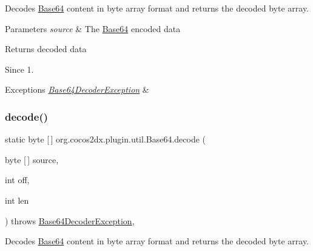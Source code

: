 Decodes \hyperlink{classorg_1_1cocos2dx_1_1plugin_1_1util_1_1Base64}{Base64} content in byte array format and returns the decoded byte array.


\begin{DoxyParams}{Parameters}
{\em source} & The \hyperlink{classorg_1_1cocos2dx_1_1plugin_1_1util_1_1Base64}{Base64} encoded data \\
\hline
\end{DoxyParams}
\begin{DoxyReturn}{Returns}
decoded data 
\end{DoxyReturn}
\begin{DoxySince}{Since}
1. 
\end{DoxySince}

\begin{DoxyExceptions}{Exceptions}
{\em \hyperlink{classorg_1_1cocos2dx_1_1plugin_1_1util_1_1Base64DecoderException}{Base64\+Decoder\+Exception}} & \\
\hline
\end{DoxyExceptions}
\mbox{\label{classorg_1_1cocos2dx_1_1plugin_1_1util_1_1Base64_a7c98b97ad848ef0e656b81020bf51d72}} 
\subsubsection{\texorpdfstring{decode()}{decode()}\hspace{0.1cm}{\footnotesize\ttfamily [3/4]}}
{\footnotesize\ttfamily static byte \mbox{[}$\,$\mbox{]} org.\+cocos2dx.\+plugin.\+util.\+Base64.\+decode (\begin{DoxyParamCaption}\item[{byte \mbox{[}$\,$\mbox{]}}]{source,  }\item[{int}]{off,  }\item[{int}]{len }\end{DoxyParamCaption}) throws \hyperlink{classorg_1_1cocos2dx_1_1plugin_1_1util_1_1Base64DecoderException}{Base64\+Decoder\+Exception}\hspace{0.3cm}{\ttfamily [inline]}, {\ttfamily [static]}}

Decodes \hyperlink{classorg_1_1cocos2dx_1_1plugin_1_1util_1_1Base64}{Base64} content in byte array format and returns the decoded byte array.


